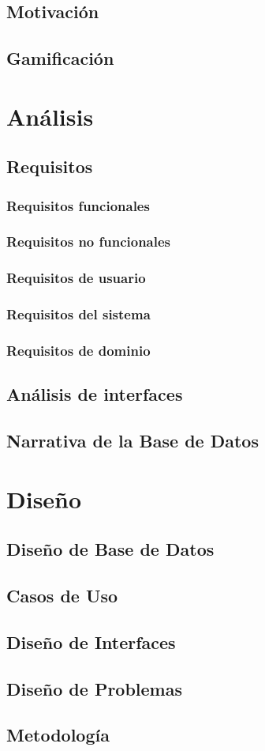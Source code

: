 \documentclass{article}
\begin{document}
\subsection{Motivación}
\subsection{Gamificación}
\section{Análisis}
\subsection{Requisitos}
\subsubsection{Requisitos funcionales} 
\subsubsection{Requisitos no funcionales} 
\subsubsection{Requisitos de usuario} 
\subsubsection{Requisitos del sistema}
\subsubsection{Requisitos de dominio}
\subsection{Análisis de interfaces}
\subsection{Narrativa de la Base de Datos}

\section{Diseño}
\subsection{Diseño de Base de Datos}
\subsection{Casos de Uso}
\subsection{Diseño de Interfaces}
\subsection{Diseño de Problemas}
\subsection{Metodología}
\end{document}
